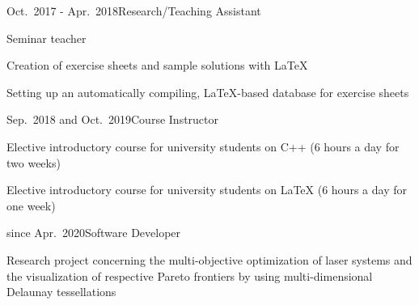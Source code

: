 \documentclass[a4paper,10pt]{cv}
\begin{document}
      \begin{cvTimeItem}{Oct.~2017 - Apr.~2018}{Research/Teaching Assistant}
        \begin{cvItemize}
          \item Seminar teacher 
          \item Creation of exercise sheets and sample solutions with LaTeX
          \item Setting up an automatically compiling, LaTeX-based database for exercise sheets
        \end{cvItemize}
      \end{cvTimeItem}
      \begin{cvTimeItem}{Sep.~2018 and Oct.~2019}{Course Instructor}
        \begin{cvItemize}
          \item Elective introductory course for university students on C++ (6 hours a day for two weeks)
          \item Elective introductory course for university students on LaTeX (6 hours a day for one week)
        \end{cvItemize}
      \end{cvTimeItem}

      \begin{cvTimeItem}{since Apr.~2020}{Software Developer}
        \begin{cvItemize}
          \item Research project concerning the multi-objective optimization of laser systems and the visualization of respective Pareto frontiers by using multi-dimensional Delaunay tessellations
        \end{cvItemize}
      \end{cvTimeItem}
\end{document}
